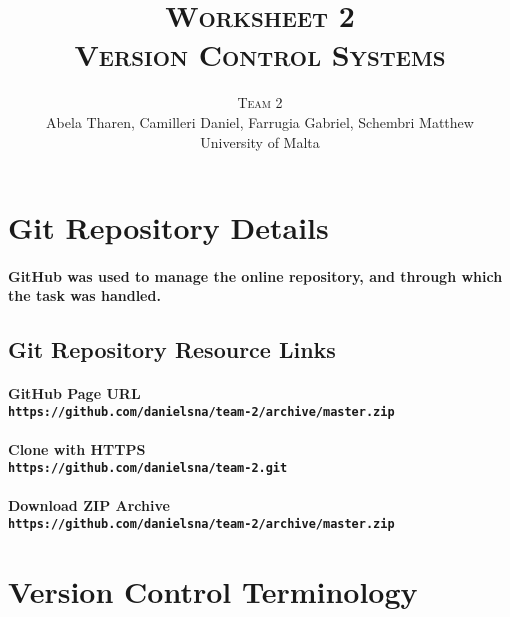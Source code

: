 \documentclass[a4paper,twoside,12pt]{article}
\newcommand{\noun}[1]{\textsc{#1}}
\begin{document}
\begin{titlepage}	
	\title{\noun{Worksheet 2\\ Version Control Systems}}

	\author{\textsc{Team 2}\\ Abela Tharen, Camilleri Daniel, Farrugia Gabriel, Schembri Matthew\\	University of Malta}
	\date{}
	
	\maketitle
	\tableofcontents
\end{titlepage}	

\pagebreak

\section{Git Repository Details}
\paragraph{GitHub was used to manage the online repository, and through which the task was handled.}
\subsection{Git Repository Resource Links}
\paragraph{GitHub Page URL\\ \texttt{https://github.com/danielsna/team-2/archive/master.zip}}
\paragraph{Clone with HTTPS\\ \texttt{https://github.com/danielsna/team-2.git}}
\paragraph{Download ZIP Archive\\ \texttt{https://github.com/danielsna/team-2/archive/master.zip}}

\pagebreak[2]
\section{Version Control Terminology}
\end{document}
